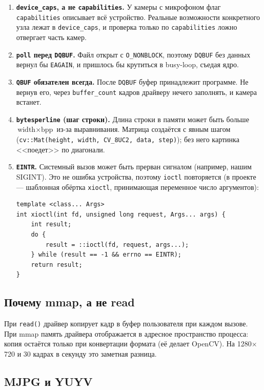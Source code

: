 \documentclass[11pt,a4paper]{article}
\theoremstyle{definition}
\theoremstyle{remark}
\begin{document}
\begin{enumerate}
  \item \textbf{\texttt{device\_caps}, а не \texttt{capabilities}.} У камеры с
        микрофоном флаг \texttt{capabilities} описывает всё устройство. Реальные
        возможности конкретного узла лежат в \texttt{device\_caps}, и проверка
        только по \texttt{capabilities} ложно отвергает часть камер.
  \item \textbf{\texttt{poll} перед \texttt{DQBUF}.} Файл открыт с
        \texttt{O\_NONBLOCK}, поэтому \texttt{DQBUF} без данных вернул бы
        \texttt{EAGAIN}, и пришлось бы крутиться в busy-loop, съедая ядро.
  \item \textbf{\texttt{QBUF} обязателен всегда.} После \texttt{DQBUF} буфер
        принадлежит программе. Не вернув его, через \texttt{buffer\_count}
        кадров драйверу нечего заполнять, и камера встанет.
  \item \textbf{\texttt{bytesperline} (шаг строки).} Длина строки в памяти может
        быть больше $\text{width} \times \text{bpp}$ из-за выравнивания.
        Матрица создаётся с явным шагом
        (\texttt{cv::Mat(height, width, CV\_8UC2, data, step)}); без него
        картинка <<поедет>> по диагонали.
  \item \textbf{\texttt{EINTR}.} Системный вызов может быть прерван сигналом
        (например, нашим SIGINT). Это не ошибка устройства, поэтому
        \texttt{ioctl} повторяется (в проекте --- шаблонная обёртка
        \texttt{xioctl}, принимающая переменное число аргументов):
        \begin{lstlisting}
template <class... Args>
int xioctl(int fd, unsigned long request, Args... args) {
    int result;
    do {
        result = ::ioctl(fd, request, args...);
    } while (result == -1 && errno == EINTR);
    return result;
}
        \end{lstlisting}
\end{enumerate}

\subsection{Почему mmap, а не read}

При \texttt{read()} драйвер копирует кадр в буфер пользователя при каждом
вызове. При mmap память драйвера отображается в адресное пространство
процесса: копия остаётся только при конвертации формата (её делает OpenCV).
На 1280$\times$720 и 30 кадрах в секунду это заметная разница.

\subsection{MJPG и YUYV}
\end{document}
